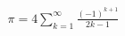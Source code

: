 \documentclass[preview]{standalone}
\begin{document}
\begin{align*}
\pi  = 4  \sum _{k=1}^{ \infty } \frac{ (-1)^{k+1} }{ 2k - 1 }
\end{align*}
\end{document}

